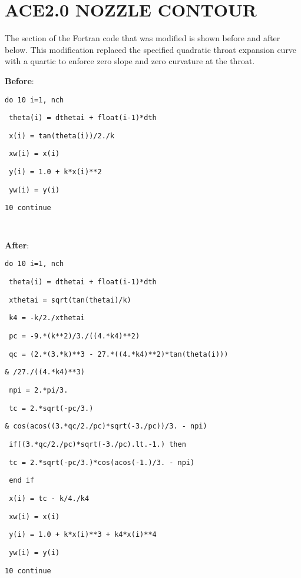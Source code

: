 %
%	 
%



\chapter{ACE2.0 NOZZLE CONTOUR}
\label{appendix:contour}

The section of the Fortran code that was modified is shown before and after below. This modification replaced the specified quadratic throat expansion curve with a quartic to enforce zero slope and zero curvature at the throat.

\begin{singlespace}
    \textbf{Before}:

    \texttt{do 10 i=1, nch}

    \texttt{\; theta(i) = dthetai + float(i-1)*dth}

    \texttt{\; x(i) = tan(theta(i))/2./k}

    \texttt{\; xw(i) = x(i)}

    \texttt{\; y(i) = 1.0 + k*x(i)**2}

    \texttt{\; yw(i) = y(i)}

    \texttt{10 continue}

    \texttt{ }
    
    \textbf{After}:

    \texttt{do 10 i=1, nch }

    \texttt{\; theta(i) = dthetai + float(i-1)*dth}

    \texttt{\; xthetai = sqrt(tan(thetai)/k)}

    \texttt{\; k4 = -k/2./xthetai}

    \texttt{\; pc = -9.*(k**2)/3./((4.*k4)**2)}

    \texttt{\; qc = (2.*(3.*k)**3 - 27.*((4.*k4)**2)*tan(theta(i)))}

    \texttt{\& \quad /27./((4.*k4)**3)}

    \texttt{\; npi = 2.*pi/3.}

    \texttt{\; tc = 2.*sqrt(-pc/3.)}

    \texttt{\& \quad *cos(acos((3.*qc/2./pc)*sqrt(-3./pc))/3. - npi)}

    \texttt{\; if((3.*qc/2./pc)*sqrt(-3./pc).lt.-1.) then}

    \texttt{\; \qquad tc = 2.*sqrt(-pc/3.)*cos(acos(-1.)/3. - npi)}

    \texttt{\; end if}

    \texttt{\; x(i) = tc - k/4./k4}

    \texttt{\; xw(i) = x(i)}

    \texttt{\; y(i) = 1.0 + k*x(i)**3 + k4*x(i)**4}

    \texttt{\; yw(i) = y(i)}

    \texttt{10 continue}
\end{singlespace}

